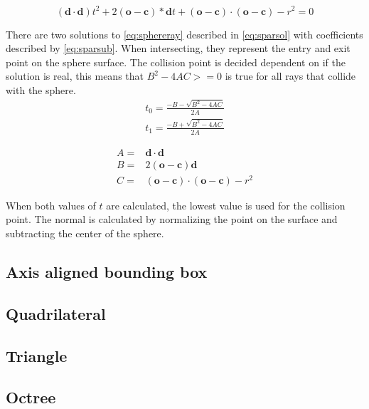 \documentclass[]{report}   %
\begin{document}
\begin{equation} \label{eq:sphereray}
(\mathbf{d} \cdot \mathbf{d})t^2 + 2(\mathbf{o} - \mathbf{c}) * \mathbf{d} t + (\mathbf{o} - \mathbf{c}) \cdot (\mathbf{o} - \mathbf{c}) - r^2=0
\end{equation}

There are two solutions to \autoref{eq:sphereray} described in \autoref{eq:sparsol} with coefficients described by \autoref{eq:sparsub}.
When intersecting, they represent the entry and exit point on the sphere surface.
The collision point is decided dependent on if the solution is real, this means that $B^2 - 4 A C >= 0$ is true for all rays that collide with the sphere.
\begin{subequations} \label{eq:sparsol}
\begin{align} 
t_0 = \frac{ -B - \sqrt{B^2 - 4 A C} }{ 2 A }\\
t_1 = \frac{ -B + \sqrt{B^2 - 4 A C} }{ 2 A }
\end{align}
\end{subequations}

\begin{subequations} \label{eq:sparsub}
\begin{align}
A =& \mathbf{d} \cdot \mathbf{d} \\
B =& 2(\mathbf{o} - \mathbf{c}) \mathbf{d} \\
C =& (\mathbf{o} - \mathbf{c}) \cdot (\mathbf{o} - \mathbf{c}) - r^2
\end{align}
\end{subequations}

When both values of $t$ are calculated, the lowest value is used for the collision point. The normal is calculated by normalizing the point on the surface and subtracting the center of the sphere.

\subsection{Axis aligned bounding box}


\subsection{Quadrilateral}
\subsection{Triangle}
\subsection{Octree}
\end{document}
